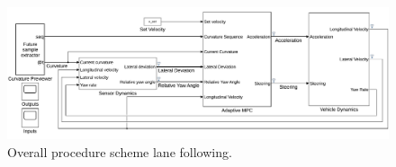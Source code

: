 \begin{figure}[!h]
	\centering
	\includegraphics[width=1\textwidth]{../figure/lane_following_AMPC.pdf}
	\caption{Overall procedure scheme lane following.}
	\label{fig:scheme_lane_following}
\end{figure}